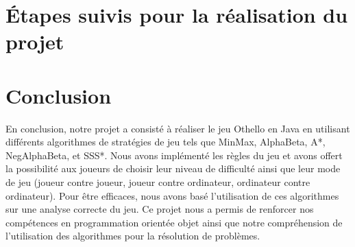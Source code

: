 \documentclass[12pt]{article}
\begin{document}
	


	\section{Étapes suivis pour la réalisation du projet}
	
	
	
	
	
	
	
	
	
	
	
	
	
	
	
	
	
	
	
	
	
	
	
	
	
	
	
	
	
	
	\section{Conclusion}
En conclusion, notre projet a consisté à réaliser le jeu Othello en Java en utilisant différents algorithmes de stratégies de jeu tels que MinMax, AlphaBeta, A*, NegAlphaBeta, et SSS*. Nous avons implémenté les règles du jeu et avons offert la possibilité aux joueurs de choisir leur niveau de difficulté ainsi que leur mode de jeu (joueur contre joueur, joueur contre ordinateur, ordinateur contre ordinateur). Pour être efficaces, nous avons basé l'utilisation de ces algorithmes sur une analyse correcte du jeu. Ce projet nous a permis de renforcer nos compétences en programmation orientée objet ainsi que notre compréhension de l'utilisation des algorithmes pour la résolution de problèmes.
\end{document}
